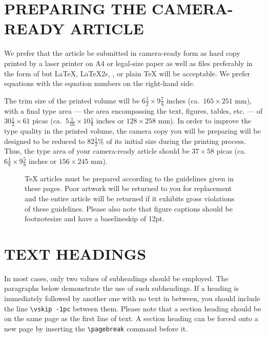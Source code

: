 \documentclass[12pt]{book}
\begin{document}
\section{PREPARING THE CAMERA-READY ARTICLE}

We prefer that the article be submitted in camera-ready form as
hard copy printed by a laser printer on A4 or legal-size paper as
well as files preferably in the form of {\AmSLaTeX} but \LaTeX,
\LaTeX2$\epsilon$, \AmSTeX, or plain {\TeX} will be acceptable. We
prefer equations with the equation numbers on the right-hand side.

The trim size of the printed volume will be $6\frac12 \times
9\frac78$ inches (ca.\ $165 \times 251$ mm), with a final type
area --- the area encompassing the text, figures, tables, etc. ---
of
$30\frac12 \times 61$ picas (ca.\ $5\frac1{16} \times 10\frac18$
inches or $128 \times 258$ mm). In order to improve the type
quality in the printed volume, the camera copy you will be
preparing will be designed to be reduced to $82\frac12\%$ of
its initial size during the printing process. Thus, the type area
of your camera-ready article should be $37 \times 58$ picas
(ca.\ $6\frac18 \times 9\frac58$ inches or $156 \times 245$ mm).

\begin{figure}[tbp]
\vspace*{5.98in}
\caption{{\TeX} articles must be prepared according to the
guidelines given in these pages. Poor artwork will be returned to
you for replacement and the entire article will be returned if it
exhibits gross violations of these guidelines. Please also note
that figure captions should be footnotesize and have a baselineskip
of 12pt.}
\end{figure}

\section{TEXT HEADINGS}

In most cases, only two values of subheadings should be employed.
The paragraphs below demonstrate the use of such subheadings. If a
heading is immediately followed by another one with no text in
between, you should include the line \verb+\vskip -1pc+ between
them.
Please note that a section heading should be on the same page as
the first
line of text. A section heading can be forced onto a new page by
inserting
the \verb+\pagebreak+ command before it.
\end{document}
